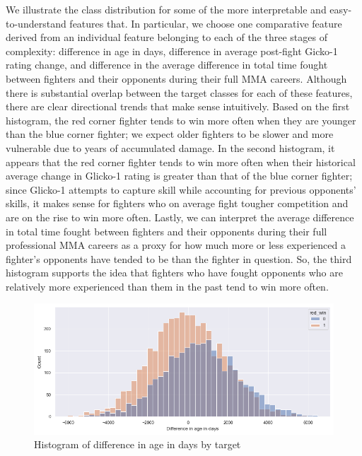 \documentclass[12pt,twoside]{report}
\begin{document}
We illustrate the class distribution for some of the more interpretable and easy-to-understand features that. In particular, we choose one comparative feature derived from an individual feature belonging to each of the three stages of complexity: difference in age in days, difference in average post-fight Gicko-1 rating change, and difference in the average difference in total time fought between fighters and their opponents during their full MMA careers. Although there is substantial overlap between the target classes for each of these features, there are clear directional trends that make sense intuitively. Based on the first histogram, the red corner fighter tends to win more often when they are younger than the blue corner fighter; we expect older fighters to be slower and more vulnerable due to years of accumulated damage. In the second histogram, it appears that the red corner fighter tends to win more often when their historical average change in Glicko-1 rating is greater than that of the blue corner fighter; since Glicko-1 attempts to capture skill while accounting for previous opponents' skills, it makes sense for fighters who on average fight tougher competition and are on the rise to win more often. Lastly, we can interpret the average difference in total time fought between fighters and their opponents during their full professional MMA careers as a proxy for how much more or less experienced a fighter's opponents have tended to be than the fighter in question. So, the third histogram supports the idea that fighters who have fought opponents who are relatively more experienced than them in the past tend to win more often.

\begin{figure}[!htb]
    \centering
    \includegraphics[width=\linewidth]{figures/age_days_diff.png}
    \caption{Histogram of difference in age in days by target}
\end{figure}
\end{document}

